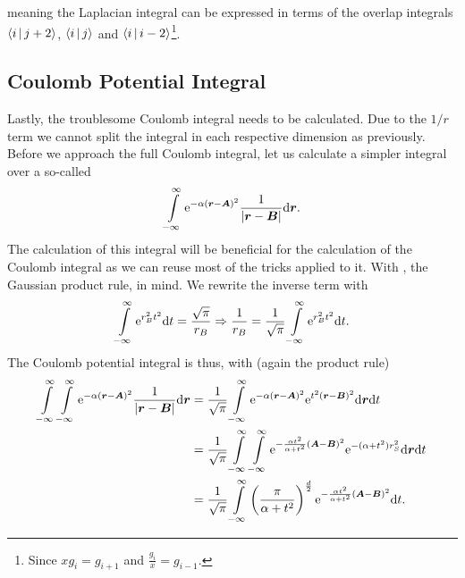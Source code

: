     meaning the Laplacian integral can be expressed in terms of the overlap
    integrals $\Braket{i|j+2}$, $\Braket{i|j}$ and
    $\Braket{i|i-2}$\footnote{Since $xg_i=g_{i+1}$ and
    $\frac{g_i}{x}=g_{i-1}$.}.

\subsection{Coulomb Potential Integral}
    Lastly, the troublesome Coulomb integral needs to be calculated. Due to the
    $1/r$ term we cannot split the integral in each respective dimension as
    previously. Before we approach the full Coulomb integral, let us calculate
    a simpler integral over a so-called 
        \begin{equation}
            \int\limits^{\infty}_{-\infty} \mathrm{e}^{-\alpha\left(\boldsymbol{{r}} - \boldsymbol{{A}}\right)^2}
            \frac{1}{\abs{\boldsymbol{{r}} - \boldsymbol{{B}}}} \mathrm{d}\boldsymbol{{r}}.
        \end{equation}
    The calculation of this integral will be beneficial for the calculation of
    the Coulomb integral as we can reuse most of the tricks applied to it. With
    , the Gaussian product rule, in mind. We
    rewrite the inverse term with
        \begin{equation}
            \int\limits^{\infty}_{-\infty} \mathrm{e}^{r^2_B t^2} \mathrm{d} t = \frac{\sqrt{\pi}}{r_B} \Rightarrow
            \frac{1}{r_B} = \frac{1}{\sqrt{\pi}} \int\limits^{\infty}_{-\infty} \mathrm{e}^{r^2_Bt^2} \mathrm{d} t.
            \label{eq:onelectronTrick1}
        \end{equation}
    The Coulomb potential integral is thus, with
    (again the product rule)
        \begin{align}
            \int\limits^{\infty}_{-\infty}\int\limits^{\infty}_{-\infty} \mathrm{e}^{-\alpha\left(\boldsymbol{{r}} - \boldsymbol{{A}}\right)^2}
            \frac{1}{\abs{\boldsymbol{{r}} - \boldsymbol{{B}}}} \mathrm{d}\boldsymbol{{r}} &=
            \frac{1}{\sqrt{\pi}}\int\limits^{\infty}_{-\infty} \mathrm{e}^{-\alpha\left(\boldsymbol{{r}} -
            \boldsymbol{{A}}\right)^2} \mathrm{e}^{t^2(\boldsymbol{{r}} - \boldsymbol{{B}})^2} \mathrm{d}\boldsymbol{{r}} \mathrm{d}
            t \nonumber \\
            &= \frac{1}{\sqrt{\pi}} \int\limits^{\infty}_{-\infty}\int\limits^{\infty}_{-\infty} \mathrm{e}^{-\frac{\alpha
            t^2}{\alpha + t^2}\left(\boldsymbol{{A}} - \boldsymbol{{B}}\right)^2}
            \mathrm{e}^{-(\alpha+t^2)r^2_S} \mathrm{d}\boldsymbol{{r}} \mathrm{d} t \nonumber \\
            &= \frac{1}{\sqrt{\pi}} \int\limits^{\infty}_{-\infty} \left(\frac{\pi}{\alpha +
            t^2}\right)^{\frac{d}{2}} \mathrm{e}^{-\frac{\alpha t^2}{\alpha +
            t^2}\left(\boldsymbol{{A}} - \boldsymbol{{B}}\right)^2} \mathrm{d} t.
            \label{eq:coulombPotentialIntegral}
        \end{align}
